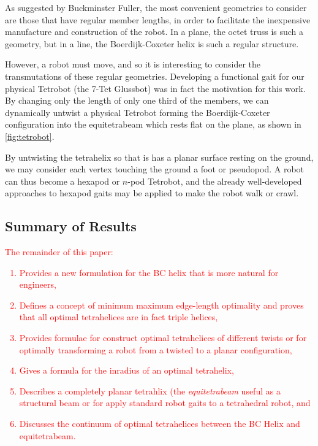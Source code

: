 \documentclass[twocolumn,10pt]{asme2ej}
\newcommand{\highlighttext}[1] {\textcolor{red}{#1}}
\begin{document}
As suggested by Buckminster Fuller, the most convenient geometries to
consider are those that have regular member lengths, in order to
facilitate the inexpensive manufacture and construction of the robot.
In a plane, the octet truss\cite{richard1961synergetic} is such a geometry, but in a line, the
Boerdijk-Coxeter helix is such a regular structure.

However, a robot must move, and so it is interesting to consider the
transmutations of these regular geometries. Developing a functional
gait for our physical Tetrobot (the 7-Tet Glussbot) was in fact the motivation
for this work.
By changing only the length of only one third of the members,
we can dynamically untwist a physical Tetrobot
forming the Boerdijk-Coxeter configuration into the equitetrabeam which rests flat on the plane,
as shown in \cref{fig:tetrobot}.

By untwisting the tetrahelix so that is has a planar surface resting on the ground,
we may consider each vertex touching the ground a foot or pseudopod. A robot can thus
become a hexapod or $n$-pod Tetrobot, and the already well-developed approaches to
hexapod gaits may be applied to make the robot walk or crawl.


\subsection{Summary of Results}

\highlighttext{
The remainder of this  paper:
\begin{enumerate}
\item Provides a new formulation for the BC helix that is more natural for engineers,
\item Defines a concept of minimum maximum edge-length optimality and proves that all
    optimal tetrahelices are in fact triple helices,
\item Provides formulae for construct optimal tetrahelices of different twists or for optimally
    transforming a
    robot from a twisted to a planar configuration,
\item Gives a formula for the inradius of an optimal tetrahelix,
\item Describes a completely planar tetrahlix (the \emph{equitetrabeam} useful as a structural beam or for apply standard robot gaits to a tetrahedral robot, and
\item Discusses the continuum of optimal tetrahelices between the BC Helix and equitetrabeam.
\end{enumerate}
}
\end{document}
